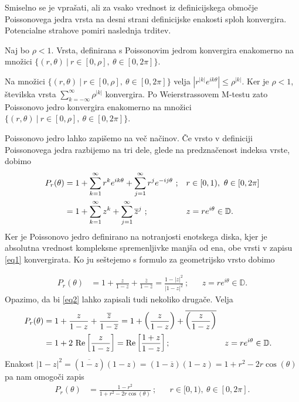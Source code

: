 \documentclass[mat1, tisk]{fmfdelo}
\begin{document}
    Smiselno se je vprašati, ali za vsako vrednost iz definicijskega območje Poissonovega jedra vrsta na desni strani definicijske enakosti sploh konvergira. Potencialne strahove pomiri naslednja trditev.
    
    \begin{trditev}
        Naj bo $\rho < 1$. Vrsta, definirana s Poissonovim jedrom konvergira enakomerno na množici $\{(r,\theta)~|~r \in [0,\rho],~ \theta \in [0,2\pi]\}$.
    \end{trditev}
    \begin{dokaz}
        Na množici $\{(r,\theta)~|~r \in [0,\rho],~ \theta \in [0,2\pi]\}$ velja $|r^{|k|} e^{i k \theta}| \leq \rho^{|k|}$. Ker je $\rho < 1$, številska vrsta $\sum_{k = -\infty}^{\infty}{\rho ^{|k|}}$ konvergira. 
        Po Weierstrassovem M-testu zato Poissonovo jedro konvergira enakomerno na množici $\{(r,\theta)~|~r \in [0,\rho],~ \theta \in [0,2\pi]\}$.
    \end{dokaz}

    Poissonovo jedro lahko zapišemo na več načinov. Če vrsto v definiciji Poissonovega jedra razbijemo na tri dele, glede na predznačenost indeksa vrste, dobimo
    \begin{align}
        P_r(\theta) &=  1 + \sum_{k = 1}^{\infty}{r^{k} e^{i k \theta}} +  \sum_{j = 1}^{\infty}{r^{j} e^{-i j \theta}}~;  &  &r \in [0,1),~\theta \in [0,2\pi] \label{eq1}\\
        &= 1 + \sum_{k=1}^{\infty}{z^k} + \sum_{j=1}^{\infty}{\overline{z}^{j}}~;   & &z = r e^{i\theta} \in \mathbb{D}. \notag
    \end{align}
    Ker je Poissonovo jedro definirano na notranjosti enotskega diska, kjer je absolutna vrednost kompleksne spremenljivke manjša od ena, obe vrsti v zapisu \eqref{eq1} konvergirata.
    Ko ju seštejemo s formulo za geometrijsko vrsto dobimo

    \begin{align}
        \label{eq2}
        P_r(\theta) &= 1 + \frac{z}{1 - z}+ \frac{\overline{z}}{1 - \overline{z}} = \frac{1 - |z|^2}{|1-z|^2}~;& &z = r e^{i\theta} \in \mathbb{D}.
    \end{align}
    Opazimo, da bi \eqref{eq2} lahko zapisali tudi nekoliko drugače. Velja
    \begin{align}
        \label{eq3}
        P_r(\theta) &= 1 + \frac{z}{1 - z}+ \frac{\overline{z}}{1 - \overline{z}} = 1 + \left(\frac{z}{1 - z} \right)+ \overline{\left(\frac{z}{1 - z}\right)} \notag \\
        &= 1 + 2~\text{Re}\left[\frac{z}{1-z}\right] =\text{Re}\left[\frac{1 + z}{1-z}\right]; & &z = r e^{i\theta} \in \mathbb{D}.
    \end{align}
    Enakost $|1 - z|^2 = (\overline{1 - z})(1 - z) = (1 - \overline{z})(1 - z) = 1 + r^2 - 2r \cos(\theta)$ pa nam omogoči zapis
    \begin{align}
        \label{eq4}
        P_r(\theta) & = \frac{1-r^2}{1+ r^2 - 2r \cos(\theta)}~; & &r \in [0,1),~\theta \in [0,2\pi].
    \end{align}
\end{document}

